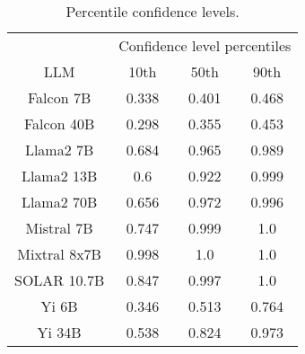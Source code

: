 \begin{table*}
\centering
\begin{tabular}{c|c|c|c}
& \multicolumn{3}{c}{Confidence level percentiles} \\ 
LLM & 10th & 50th & 90th\\ \hline
Falcon 7B & 0.338 & 0.401 & 0.468\\
Falcon 40B & 0.298 & 0.355 & 0.453\\
Llama2 7B & 0.684 & 0.965 & 0.989\\
Llama2 13B & 0.6 & 0.922 & 0.999\\
Llama2 70B & 0.656 & 0.972 & 0.996\\
Mistral 7B & 0.747 & 0.999 & 1.0\\
Mixtral 8x7B & 0.998 & 1.0 & 1.0\\
SOLAR 10.7B & 0.847 & 0.997 & 1.0\\
Yi 6B & 0.346 & 0.513 & 0.764\\
Yi 34B & 0.538 & 0.824 & 0.973\\
\hline
\end{tabular}
\caption{Percentile confidence levels.}
\label{tab:percentile_conf}
\end{table*}

